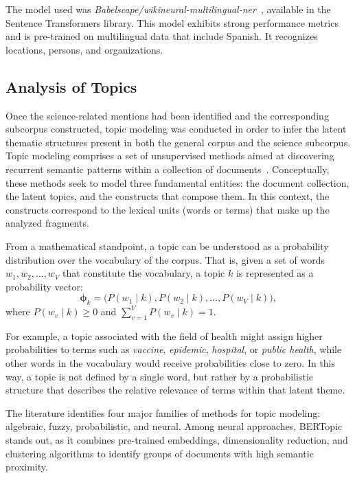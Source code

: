 \documentclass[pdflatex,sn-mathphys-num,iicol]{sn-jnl}
\begin{document}
	The model used was \textit{Babelscape/wikineural-multilingual-ner}~\cite{tedeschi-etal-2021-wikineural-combined}, available in the Sentence Transformers library. This model exhibits strong performance metrics and is pre-trained on multilingual data that include Spanish. It recognizes locations, persons, and organizations.
	
	\subsection{Analysis of Topics}\label{subsec:topics}
	
	Once the science-related mentions had been identified and the corresponding subcorpus constructed, topic modeling was conducted in order to infer the latent thematic structures present in both the general corpus and the science subcorpus. Topic modeling comprises a set of unsupervised methods aimed at discovering recurrent semantic patterns within a collection of documents~\cite{Abdelrazek2023}. Conceptually, these methods seek to model three fundamental entities: the document collection, the latent topics, and the constructs that compose them. In this context, the constructs correspond to the lexical units (words or terms) that make up the analyzed fragments.
	
	From a mathematical standpoint, a topic can be understood as a probability distribution over the vocabulary of the corpus. That is, given a set of words $w_1, w_2, \dots, w_V$ that constitute the vocabulary, a topic $k$ is represented as a probability vector:
	\[
	\boldsymbol{\phi}_k = \bigl( P(w_1 \mid k), P(w_2 \mid k), \dots, P(w_V \mid k) \bigr),
	\]
	where $P(w_v \mid k) \ge 0$ and $\sum_{v=1}^{V} P(w_v \mid k) = 1$.
	
	For example, a topic associated with the field of health might assign higher probabilities to terms such as \textit{vaccine}, \textit{epidemic}, \textit{hospital}, or \textit{public health}, while other words in the vocabulary would receive probabilities close to zero. In this way, a topic is not defined by a single word, but rather by a probabilistic structure that describes the relative relevance of terms within that latent theme.
	
	The literature identifies four major families of methods for topic modeling: algebraic, fuzzy, probabilistic, and neural. Among neural approaches, BERTopic~\cite{Grootendorst2022} stands out, as it combines pre-trained embeddings, dimensionality reduction, and clustering algorithms to identify groups of documents with high semantic proximity.
	
\end{document}
